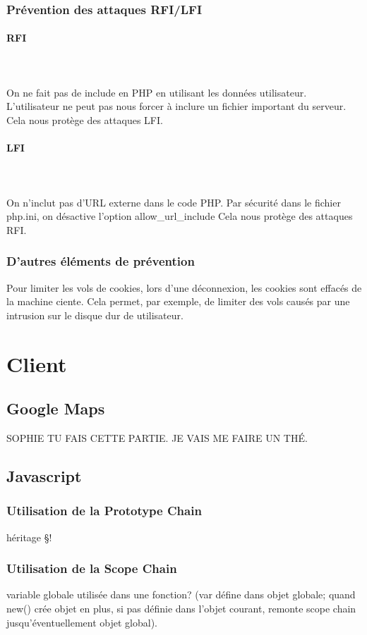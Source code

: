 \documentclass[a4paper]{article}
\begin{document}
\subsubsection{Prévention des attaques RFI/LFI}
		
\paragraph{RFI}
~~\\
\\
On ne fait pas de include en PHP en utilisant les données utilisateur.
L'utilisateur ne peut pas nous forcer à inclure un fichier important du serveur.
Cela nous protège des attaques LFI.

\paragraph{LFI}
~~\\
\\
On n'inclut pas d'URL externe dans le code PHP.
Par sécurité dans le fichier php.ini, on désactive l'option allow\_url\_include 
Cela nous protège des attaques RFI.
		
\subsubsection{D'autres éléments de prévention}

Pour limiter les vols de cookies, lors d'une déconnexion, les cookies sont
effacés de la machine ciente. Cela permet, par exemple, de limiter des vols
causés par une intrusion sur le disque dur de utilisateur.
 		
\section{Client}
\subsection{Google Maps}
SOPHIE TU FAIS CETTE PARTIE. JE VAIS ME FAIRE UN THÉ.
\subsection{Javascript}
\subsubsection{Utilisation de la Prototype Chain}
héritage §!
\subsubsection{Utilisation de la Scope Chain}
variable globale utilisée dans une fonction?
(var défine dans objet globale; quand new() crée
objet en plus, si pas définie dans l'objet courant,
remonte scope chain jusqu'éventuellement objet global).
\end{document}
